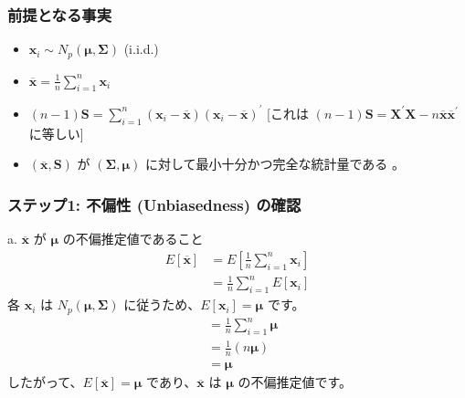\documentclass[aspectratio=169]{beamer}
\begin{document}
\begin{frame}
\frametitle{前提となる事実}
\begin{itemize}
    \item $\bm{x}_i \sim N_p(\bm{\mu},\bm{\Sigma})$ (i.i.d.) 
    \item $\overline{\bm{x}} = \frac{1}{n}\sum_{i=1}^{n}\bm{x}_i$ 
    \item $(n-1)\bm{S}=\sum_{i=1}^{n}(\bm{x}_i-\overline{\bm{x}})(\bm{x}_i-\overline{\bm{x}})^{\prime}$ [これは $(n-1)\bm{S}=\bm{X}^{\prime}\bm{X}-n\overline{\bm{x}}\overline{\bm{x}}^{\prime}$ に等しい]
    \item $(\overline{\bm{x}},\bm{S})$ が $(\bm{\Sigma},\bm{\mu})$ に対して最小十分かつ完全な統計量である  。
\end{itemize}
\end{frame}

\begin{frame}
\frametitle{ステップ1: 不偏性 (Unbiasedness) の確認}
\begin{block}{a. $\overline{\bm{x}}$ が $\bm{\mu}$ の不偏推定値であること}
\begin{align*}
E[\overline{\bm{x}}] &= E\left[\frac{1}{n}\sum_{i=1}^{n}\bm{x}_i\right] \\
&= \frac{1}{n}\sum_{i=1}^{n}E[\bm{x}_i]
\end{align*}
各 $\bm{x}_i$ は $N_p(\bm{\mu},\bm{\Sigma})$ に従うため、$E[\bm{x}_i]=\bm{\mu}$ です。
\begin{align*}
&= \frac{1}{n}\sum_{i=1}^{n}\bm{\mu} \\
&= \frac{1}{n}(n\bm{\mu}) \\
&= \bm{\mu}
\end{align*}
したがって、$E[\overline{\bm{x}}]=\bm{\mu}$ であり、$\overline{\bm{x}}$ は $\bm{\mu}$ の不偏推定値です。
\end{block}
\end{frame}
\end{document}
